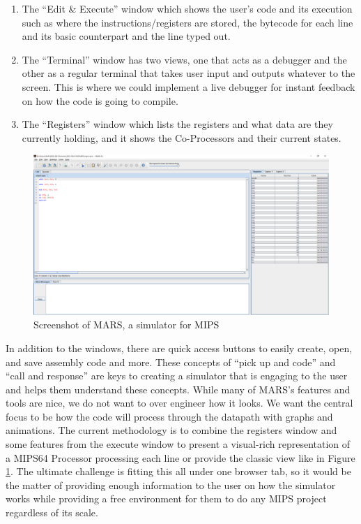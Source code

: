 \documentclass[
    paper=letter,
    parskip=half,
    fontsize=12pt,
    titlepage=firstiscover,
    toc=bibliography,
    numbers=endperiod
]{scrartcl}
\providecommand{\tightlist}{%
  \setlength{\itemsep}{0pt}\setlength{\parskip}{0pt}}
\begin{document}
\begin{enumerate}
    \tightlist
    \item The ``Edit \& Execute'' window which shows the user's code and its
          execution such as where the instructions/registers are stored, the
          bytecode for each line and its basic counterpart and the line typed out.
    \item The ``Terminal'' window has two views, one that acts as a debugger and
          the other as a regular terminal that takes user input and outputs
          whatever to the screen. This is where we could implement a live debugger
          for instant feedback on how the code is going to compile.
    \item The ``Registers'' window which lists the registers and what data are
          they currently holding, and it shows the Co-Processors and their current
          states.
\end{enumerate}

\begin{figure}[H]
    \includegraphics[width=\textwidth]{mars}
    \caption{Screenshot of MARS, a simulator for MIPS}
    \label{fig:mars}
\end{figure}

In addition to the windows, there are quick access buttons to easily
create, open, and save assembly code and more. These concepts of ``pick
up and code'' and ``call and response'' are keys to creating a simulator
that is engaging to the user and helps them understand these concepts.
While many of MARS's features and tools are nice, we do not want to over
engineer how it looks. We want the central focus to be how the code will
process through the datapath with graphs and animations. The current
methodology is to combine the registers window and some features from
the execute window to present a visual-rich representation of a MIPS64
Processor processing each line or provide the classic view like in
Figure \ref{fig:mars}. The ultimate challenge is fitting this all under
one browser tab, so it would be the matter of providing enough
information to the user on how the simulator works while providing a
free environment for them to do any MIPS project regardless of its
scale.
\end{document}
